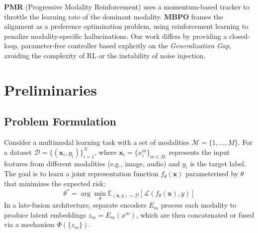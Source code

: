 \documentclass[10pt, twocolumn, letterpaper]{article}
\begin{document}
\textbf{PMR} (Progressive Modality Reinforcement) \cite{balancebenchmark} uses a momentum-based tracker to throttle the learning rate of the dominant modality. \textbf{MBPO} \cite{mbpo} frames the alignment as a preference optimization problem, using reinforcement learning to penalize modality-specific hallucinations. Our work differs by providing a closed-loop, parameter-free controller based explicitly on the \textit{Generalization Gap}, avoiding the complexity of RL or the instability of noise injection.


\begin{table}[h]
\centering
{}
\caption{\textbf{Comparison of Multimodal Imbalance Mitigation Strategies.} Our method combines the dynamic adaptability of OGM-GE with the low computational footprint required for modern large-scale pre-training.}
\label{tab:relwork}
\end{table}

\section{Preliminaries}
\subsection{Problem Formulation}
Consider a multimodal learning task with a set of modalities $\mathcal{M} = \{1, \dots, M\}$. For a dataset $\mathcal{D} = \{(\mathbf{x}_i, y_i)\}_{i=1}^N$, where $\mathbf{x}_i = \{x_i^m\}_{m \in \mathcal{M}}$ represents the input features from different modalities (e.g., image, audio) and $y_i$ is the target label. The goal is to learn a joint representation function $f_\theta(\mathbf{x})$ parameterized by $\theta$ that minimizes the expected risk:
\begin{equation}
    \theta^* = \arg\min_\theta \mathbb{E}_{(\mathbf{x}, y) \sim \mathcal{D}} [\mathcal{L}(f_\theta(\mathbf{x}), y)]
\end{equation}
In a late-fusion architecture, separate encoders $E_m$ process each modality to produce latent embeddings $z_m = E_m(x^m)$, which are then concatenated or fused via a mechanism $\Phi(\{z_m\})$.
\end{document}
